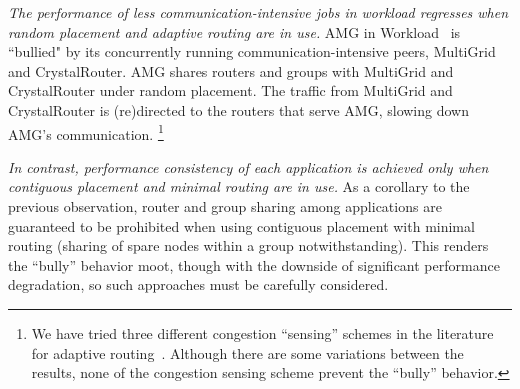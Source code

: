 \emph{The performance of less communication-intensive jobs in workload regresses when random placement and adaptive routing are in use.} 
AMG in Workload~ is ``bullied" by its concurrently running communication-intensive peers, MultiGrid and CrystalRouter.
AMG shares routers and groups with MultiGrid and CrystalRouter under random placement. 
The traffic from MultiGrid and CrystalRouter is (re)directed to the routers that serve AMG, 
slowing down AMG's communication. 
\footnote{We have tried three different congestion ``sensing'' schemes in the literature for adaptive routing~\cite{won-prog-adaptive}. Although there are some variations between the results, none of the congestion sensing scheme prevent the ``bully'' behavior.}

\emph{In contrast, performance consistency of each application is achieved only when contiguous placement and minimal routing are in use.} 
As a corollary to the previous observation, router and group sharing among applications are guaranteed to be prohibited when using contiguous placement with minimal routing (sharing of spare nodes within a group notwithstanding). This renders the ``bully'' behavior moot, though with the downside of significant performance degradation, so such approaches must be carefully considered.

